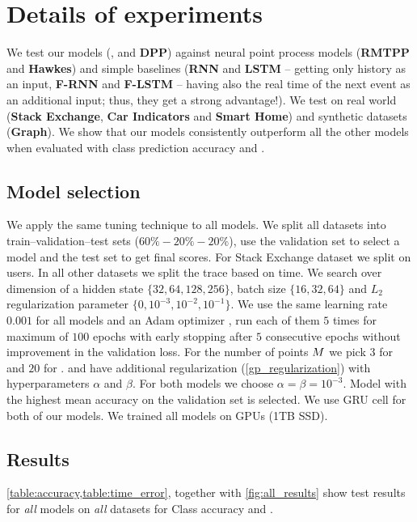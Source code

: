 \section{Details of experiments}

We test our models (\textbf{\GPModel}, \textbf{\DirModel} and \textbf{DPP}) against neural point process models (\textbf{RMTPP} and \textbf{Hawkes}) and simple baselines (\textbf{RNN} and \textbf{LSTM} -- getting only history as an input, \textbf{F-RNN} and \textbf{F-LSTM} -- having also the real time of the next event as an additional input; thus, they get a strong advantage!).
We test on real world (\textbf{Stack Exchange}, \textbf{Car Indicators} and \textbf{Smart Home}) and synthetic datasets (\textbf{Graph}). We show that our models consistently outperform all the other models when evaluated with class prediction accuracy and \TimeScore.

\subsection{Model selection}\label{model-selection}

We apply the same tuning technique to all models. We split all datasets into train--validation--test sets ($60\%-20\%-20\%$), use the validation set to select a model and the test set to get final scores. For Stack Exchange dataset we split on users. In all other datasets we split the trace based on time. We search over dimension of a hidden state $\{32,64,128,256\}$, batch size $\{16,32,64\}$ and $L_2$ regularization parameter $\{0, 10^{-3}, 10^{-2}, 10^{-1}\}$. We use the same learning rate $0.001$ for all models and an Adam optimizer \cite{Adam}, run each of them $5$ times for maximum of $100$ epochs with early stopping after $5$ consecutive epochs without improvement in the validation loss. For the number of points $M$ we pick $3$ for \GPModel and $20$ for \DirModel. \GPModel and \DirModel have additional regularization (\cref{gp_regularization}) with hyperparameters $\alpha$ and $\beta$. For both models we choose $\alpha = \beta = 10^{-3}$. Model with the highest mean accuracy on the validation set is selected. We use GRU cell \cite{GRU} for both of our models. We trained all models on GPUs (1TB SSD).

\subsection{Results}\label{detail-results}

\cref{table:accuracy,table:time_error}, together with \cref{fig:all_results}
show test results for \textit{all} models on \textit{all} datasets for Class accuracy and \TimeScore.

